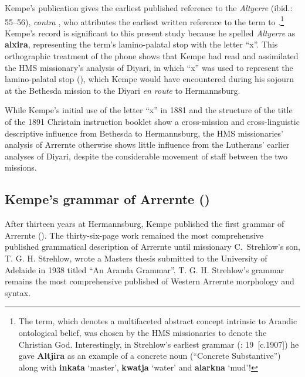 Kempe’s \citeyear{kempe_report_1881} publication gives the earliest published reference to the \textit{Altyerre} (ibid.: 55–56), \textit{contra} \citet{green_altyerre_2012}, who attributes the earliest written reference to the term to \citet{schulze_aborigines_1890}.\footnote{The term, which denotes a multifaceted abstract concept intrinsic to Arandic ontological belief, was chosen by the HMS missionaries to denote the Christian God. Interestingly, in Strehlow’s earliest grammar (\citeyear{strehlow_untitled_1931}: 19~[c.1907]) he gave \textbf{Altjira} as an example of a concrete noun (``Concrete Substantive'') along with \textbf{inkata} `master', \textbf{kwatja} `water' and \textbf{alarkna} `mud'!} Kempe’s record is significant to this present study because he spelled \textit{Altyerre} as \textbf{alxira}, representing the term’s lamino-palatal stop with the letter ``x''. This orthographic treatment of the phone shows that Kempe had read and assimilated the HMS missionary’s analysis of Diyari, in which “x” was used to represent the lamino-palatal stop (), which Kempe would have encountered during his sojourn at the Bethesda mission to the Diyari \textit{en route} to Hermannsburg.

While Kempe’s initial use of the letter “x” in 1881 and the structure of the title of the 1891 Christain instruction booklet show a cross-mission and cross-linguistic descriptive influence from Bethesda to Hermannsburg, the HMS missionaries' analysis of Arrernte otherwise shows little influence from the Lutherans' earlier analyses of Diyari, despite the considerable movement of staff between the two missions.

\subsection{Kempe’s grammar of Arrernte (\citeyear{kempe_grammar_1891})}
\label{sec:key:9.1.2}\label{bkm:Ref74837211}

After thirteen years at Hermannsburg, Kempe published the first grammar of Arrernte (\citeyear{kempe_grammar_1891}). The thirty-six-page work remained the most comprehensive published grammatical description of Arrernte until missionary C.~Strehlow’s son, T. G. H. Strehlow, wrote a Masters thesis submitted to the University of Adelaide in 1938 titled “An Aranda Grammar”. T. G. H. Strehlow’s grammar remains the most comprehensive published of Western Arrernte morphology and syntax.


